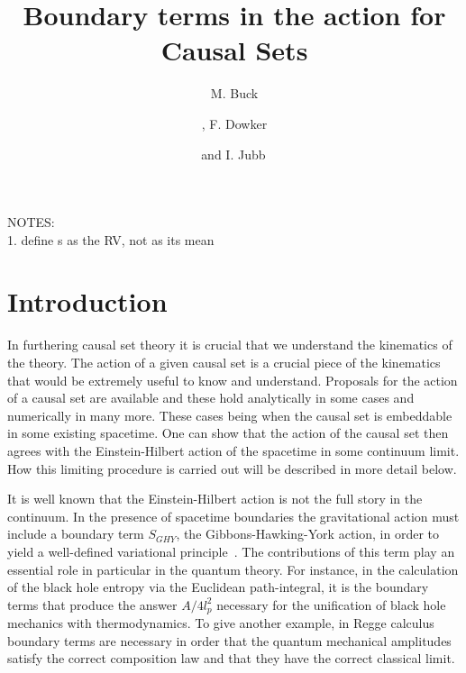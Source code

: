 \documentclass[12pt]{article}
\title{Boundary terms in the action for Causal Sets}
\author[a]{M. Buck}
\author[a,b]{\!, F. Dowker}
\author[a]{and I. Jubb\,}
\affiliation[a]{Theoretical Physics Group, Blackett Laboratory, Imperial College, London, SW7 2AZ, U.K.}
\affiliation[b]{Institute for Quantum Computing, University of Waterloo, ON, N2L 2Y5, Canada}
\newcommand{\mb}[1]{\marginnote{\texttt{\small MB:\,#1}}}
\begin{document}
\maketitle


\noindent NOTES:\\
1. define s as the RV, not as its mean

\section{Introduction}


In furthering causal set theory it is crucial that we understand the kinematics of the theory. The action of a given causal set is a crucial piece of the kinematics that would be extremely useful to know and understand. Proposals for the action of a causal set are available \cite{Benincasa_Dowker:The_Scalar_Curvature_of_a_Causal_Set} and these hold analytically in some cases and numerically in many more.\mb{rephrase} These cases being when the causal set is embeddable in some existing spacetime. One can show that the action of the causal set then agrees with the Einstein-Hilbert action of the spacetime in some continuum limit. How this limiting procedure is carried out will be described in more detail below.

It is well known that the Einstein-Hilbert action is not the full story in the continuum. In the presence of spacetime boundaries the gravitational action must include a boundary term $S_{GHY}$, the Gibbons-Hawking-York action, in order to yield a well-defined variational principle~\cite{Gibbons_Hawking_Boundary}. The contributions of this term play an essential role in particular in the quantum theory. For instance, in the calculation of the black hole entropy via the Euclidean path-integral, it is the boundary terms that produce the answer $A/4l_p^2$ necessary for the unification of black hole mechanics with thermodynamics. To give another example, in Regge calculus boundary terms are necessary in order that the quantum mechanical amplitudes satisfy the correct composition law and that they have the correct classical limit\cite{boundarybook,hartlesorkin}.
\end{document}
